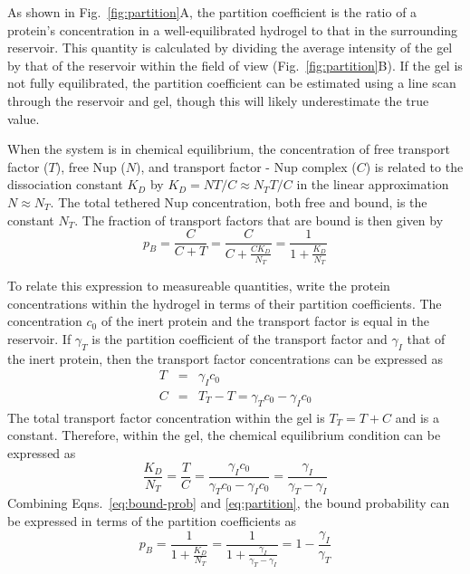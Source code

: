 As shown in Fig.~\ref{fig:partition}A, the partition coefficient is the ratio of a protein's concentration in a well-equilibrated hydrogel to that in the surrounding reservoir.  This quantity is calculated by dividing the average intensity of the gel by that of the reservoir within the field of view (Fig.~\ref{fig:partition}B).  If the gel is not fully equilibrated, the partition coefficient can be estimated using a line scan through the reservoir and gel, though this will likely underestimate the true value.

When the system is in chemical equilibrium, the concentration of free transport factor ($T$), free Nup ($N$), and transport factor - Nup complex ($C$) is related to the dissociation constant $K_D$ by
$K_D = NT/C \approx N_TT/C$ in the linear approximation $N \approx N_T$.   The total tethered Nup concentration, both free and bound, is the constant $N_T$.  The fraction of transport factors that are bound is then given by
\begin{equation}
p_B = \frac{C}{C+T} = \frac{C}{C+\frac{CK_D}{N_T}} = \frac{1}{1+\frac{K_D}{N_T}} %
\label{eq:bound-prob}
\end{equation} %

To relate this expression to measureable quantities, write the protein concentrations within the hydrogel in terms of their partition coefficients. The concentration $c_0$ of the inert protein and the transport factor is equal in the reservoir.  If $\gamma_T$ is the partition coefficient of the transport factor and $\gamma_I$ that of the inert protein, then the transport factor concentrations can be expressed as
\begin{eqnarray}
T &=& \gamma_I c_0\\
C & =& T_T - T = \gamma_Tc_0 - \gamma_I c_0
\label{eq:gamma}
\end{eqnarray} 
The total transport factor concentration within the gel is $T_T = T + C$ and is a constant.
Therefore, within the gel, the chemical equilibrium condition can be expressed as
\begin{equation}
\frac{K_D}{N_T} = \frac{T}{C} = \frac{\gamma_I c_0}{\gamma_T c_0 - \gamma_I c_0} = \frac{\gamma_I}{\gamma_T - \gamma_I}
\label{eq:partition}
\end{equation}
Combining Eqns.~\ref{eq:bound-prob} and \ref{eq:partition}, the bound probability can be expressed in terms of the partition coefficients as
\begin{equation}
p_B= \frac{1}{1+\frac{K_D}{N_T}} = \frac{1}{1+\frac{\gamma_I}{\gamma_T - \gamma_I}} = 1 - \frac{\gamma_I}{\gamma_T}
\label{eq:bound-prob-final}
\end{equation}

